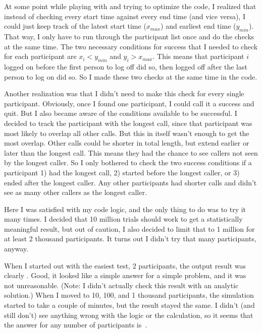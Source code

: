\documentclass{article}
\begin{document}
At some point while playing with and trying to optimize the code, I realized that instead of checking every start time against every end time (and vice versa), I could just keep track of the latest start time ($x_{max}$) and earliest end time ($y_{min}$).
That way, I only have to run through the participant list once and do the checks at the same time.
The two necessary conditions for success that I needed to check for each participant are $x_{i}<y_{min}$ and $y_{i}>x_{max}$.
This means that participant $i$ logged on before the first person to log off did so, then logged off after the last person to log on did so.
So I made these two checks at the same time in the code.

Another realization was that I didn't need to make this check for every single participant.
Obviously, once I found one participant, I could call it a success and quit.
But I also became aware of the conditions available to be successful.
I decided to track the participant with the longest call, since that participant was most likely to overlap all other calls.
But this in itself wasn't enough to get the most overlap.
Other calls could be shorter in total length, but extend earlier or later than the longest call.
This means they had the chance to see callers not seen by the longest caller.
So I only bothered to check the two success conditions if a participant 1) had the longest call, 2) started before the longest caller, or 3) ended after the longest caller.
Any other participants had shorter calls and didn't see as many other callers as the longest caller.

Here I was satisfied with my code logic, and the only thing to do was to try it many times.
I decided that 10 million trials should work to get a statistically meaningful result, but out of caution, I also decided to limit that to 1 million for at least 2 thousand participants.
It turns out I didn't try that many participants, anyway.

When I started out with the easiest test, 2 participants, the output result was clearly .
Good, it looked like a simple answer for a simple problem, and it was not unreasonable.
(Note: I didn't actually check this result with an analytic solution.)
When I moved to 10, 100, and 1 thousand participants, the simulation started to take a couple of minutes, but the result stayed the same.
I didn't (and still don't) see anything wrong with the logic or the calculation, so it seems that the answer for any number of participants is
\,.
\end{document}
